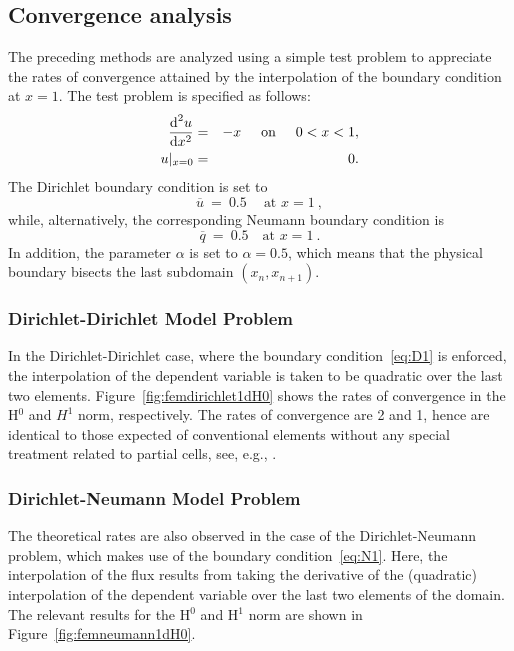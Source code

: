 \documentclass[12pt,twoside]{article}
\begin{document}
\subsection{Convergence analysis}\label{sec:convergence1d}
\par
The preceding methods are analyzed using a simple test problem to appreciate 
the rates of convergence attained by the interpolation of the boundary 
condition at $x=1$. The test problem is specified as follows: 
%
\begin{eqnarray}
\frac{\text{d}^2 u}{\text{d} x^2} &=& -x \hspace{0.5cm}\text{on}\hspace{0.5cm}0 < x < 1,\\
u\vert_{x=0} &=& 0 . 
\end{eqnarray}
%
The Dirichlet boundary condition is set to 
%
\begin{equation}\label{eq:D1}
\overline{u}\ =\ 0.5\ \quad \text{at } x=1\ ,
\end{equation}
%
while, alternatively, the corresponding Neumann boundary condition is 
%
\begin{equation}\label{eq:N1}
\overline{q}\ =\ 0.5 \quad \text{at } x=1\ . 
\end{equation}
%
In addition, the parameter $\alpha$ is set to $\alpha=0.5$, which means that 
the physical boundary bisects the last subdomain 
$(x_n,x_{n+1})$.  
%
\subsubsection{Dirichlet-Dirichlet Model Problem}
\par
In the Dirichlet-Dirichlet case, where the boundary condition~\eqref{eq:D1} 
is enforced, the interpolation of the dependent variable is taken to
be quadratic over the last two elements. 
Figure~\ref{fig:femdirichlet1dH0} shows the rates of convergence in the H$^0$ and $H^1$ norm,
respectively. The rates of convergence are 2 and 1, hence are identical to 
those expected of conventional elements without any special treatment related 
to partial cells, see, e.g., \cite{CIARLET80}. \\
\subsubsection{Dirichlet-Neumann Model Problem}
\par
The theoretical rates are also observed in the case of the
Dirichlet-Neumann problem, which makes use of the boundary
condition~\eqref{eq:N1}. Here, the interpolation of the flux 
results from taking the derivative of the (quadratic) interpolation of
the dependent variable over the last two elements of the domain. 
The relevant results for the H$^0$ and H$^1$ norm are shown 
in Figure~\ref{fig:femneumann1dH0}. 
\end{document}
